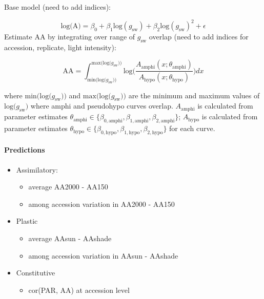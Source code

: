 \documentclass[
  letterpaper,
  DIV=11,
  numbers=noendperiod]{scrartcl}
\let\oldparagraph\paragraph
\renewcommand{\paragraph}[1]{\oldparagraph{#1}\mbox{}}
\providecommand{\tightlist}{%
  \setlength{\itemsep}{0pt}\setlength{\parskip}{0pt}}\usepackage{longtable,booktabs,array}
\newcommand{\aax}{$\mathrm{AA}$}
\newcommand{\Aamphi}{$A_{\mathrm{amphi}}$}
\newcommand{\Ahypo}{$A_{\mathrm{hypo}}$}
\newcommand{\gsw}{$g_\text{sw}$}
\begin{document}
Base model (need to add indices):

\[\text{log(A)} = \beta_0 + \beta_1 \text{log}(g_\text{sw}) + \beta_2 \text{log}(g_\text{sw}) ^ 2 + \epsilon\]
Estimate \aax{} by integrating over range of \gsw{} overlap (need to add
indices for accession, replicate, light intensity):

\[\mathrm{AA} = \int_{\text{min(log(}g_\text{sw}))}^{\text{max(log(}g_\text{sw}))} \text{log}\bigg(\frac{A_\text{amphi}(x; \theta_\text{amphi})}{A_\text{hypo}(x; \theta_\text{hypo})}\bigg) dx\]

where \(\text{min(log(}g_\text{sw}))\) and
\(\text{max(log(}g_\text{sw}))\) are the minimum and maximum values of
\(\text{log(}g_\text{sw})\) where amphi and pseudohypo curves overlap.
\Aamphi{} is calculated from parameter estimates
\(\theta_\text{amphi} \in \{\beta_{0,\text{amphi}}, \beta_{1,\text{amphi}}, \beta_{2,\text{amphi}}\}\);
\Ahypo{} is calculated from parameter estimates
\(\theta_\text{hypo} \in \{\beta_{0,\text{hypo}}, \beta_{1,\text{hypo}}, \beta_{2,\text{hypo}}\}\)
for each curve.

\paragraph{Predictions}\label{predictions}

\begin{itemize}
\tightlist
\item
  Assimilatory:

  \begin{itemize}
  \tightlist
  \item
    average AA2000 - AA150
  \item
    among accession variation in AA2000 - AA150
  \end{itemize}
\item
  Plastic

  \begin{itemize}
  \tightlist
  \item
    average AAsun - AAshade
  \item
    among accession variation in AAsun - AAshade
  \end{itemize}
\item
  Constitutive

  \begin{itemize}
  \tightlist
  \item
    cor(PAR, AA) at accession level
  \end{itemize}
\end{itemize}
\end{document}
